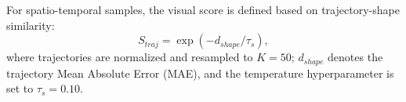 For spatio-temporal samples, the visual score is defined based on trajectory-shape similarity:
\begin{equation}
S_{traj}
=
\exp(-d_{shape}/\tau_s),
\end{equation}
where trajectories are normalized and resampled to \(K=50\); \(d_{shape}\) denotes the trajectory Mean Absolute Error (MAE), and the temperature hyperparameter is set to \(\tau_s = 0.10\).






